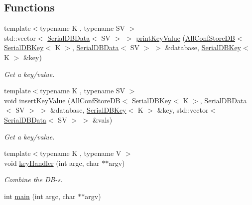 \subsection*{Functions}
\begin{DoxyCompactItemize}
\item 
{\footnotesize template$<$typename K , typename SV $>$ }\\std\+::vector$<$ \mbox{\hyperlink{classADATIO_1_1SerialDBData}{Serial\+D\+B\+Data}}$<$ SV $>$ $>$ \mbox{\hyperlink{adat-devel_2main_2dbutil_2dbavg_8cc_ad99136392a8c4064c84803fee6e0c857}{print\+Key\+Value}} (\mbox{\hyperlink{classFILEDB_1_1AllConfStoreDB}{All\+Conf\+Store\+DB}}$<$ \mbox{\hyperlink{classADATIO_1_1SerialDBKey}{Serial\+D\+B\+Key}}$<$ K $>$, \mbox{\hyperlink{classADATIO_1_1SerialDBData}{Serial\+D\+B\+Data}}$<$ SV $>$ $>$ \&database, \mbox{\hyperlink{classADATIO_1_1SerialDBKey}{Serial\+D\+B\+Key}}$<$ K $>$ \&key)
\begin{DoxyCompactList}\small\item\em Get a key/value. \end{DoxyCompactList}\item 
{\footnotesize template$<$typename K , typename SV $>$ }\\void \mbox{\hyperlink{adat-devel_2main_2dbutil_2dbavg_8cc_a8dcef9d29a9dfc5045f4ee378e94fca3}{insert\+Key\+Value}} (\mbox{\hyperlink{classFILEDB_1_1AllConfStoreDB}{All\+Conf\+Store\+DB}}$<$ \mbox{\hyperlink{classADATIO_1_1SerialDBKey}{Serial\+D\+B\+Key}}$<$ K $>$, \mbox{\hyperlink{classADATIO_1_1SerialDBData}{Serial\+D\+B\+Data}}$<$ SV $>$ $>$ \&database, \mbox{\hyperlink{classADATIO_1_1SerialDBKey}{Serial\+D\+B\+Key}}$<$ K $>$ \&key, std\+::vector$<$ \mbox{\hyperlink{classADATIO_1_1SerialDBData}{Serial\+D\+B\+Data}}$<$ SV $>$ $>$ \&vals)
\begin{DoxyCompactList}\small\item\em Get a key/value. \end{DoxyCompactList}\item 
{\footnotesize template$<$typename K , typename V $>$ }\\void \mbox{\hyperlink{adat-devel_2main_2dbutil_2dbavg_8cc_a57918e290614430413950cb4fdfd967e}{key\+Handler}} (int argc, char $\ast$$\ast$argv)
\begin{DoxyCompactList}\small\item\em Combine the D\+B-\/s. \end{DoxyCompactList}\item 
int \mbox{\hyperlink{adat-devel_2main_2dbutil_2dbavg_8cc_a3c04138a5bfe5d72780bb7e82a18e627}{main}} (int argc, char $\ast$$\ast$argv)
\end{DoxyCompactItemize}



